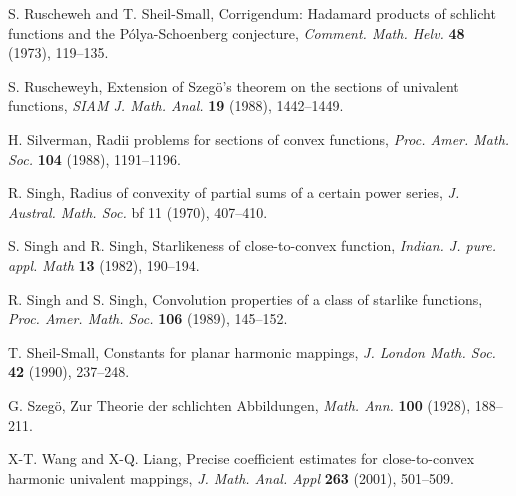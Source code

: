 \documentclass[a4paper,12pt]{amsart}
\theoremstyle{plain}
\theoremstyle{definition}
\begin{document}
\begin{thebibliography}{99}
{\sc S. Ruscheweh} and {\sc T. Sheil-Small}, Corrigendum:  Hadamard products of schlicht functions and the P\'{o}lya-Schoenberg conjecture, {\it Comment. Math. Helv.} {\bf 48} (1973), 119--135.

{\sc S. Ruscheweyh}, Extension of Szeg\"o's theorem on the sections of univalent functions, {\it SIAM J. Math. Anal.} {\bf 19} (1988), 1442--1449.

{\sc H. Silverman}, Radii problems for sections of convex functions, {\it Proc. Amer. Math. Soc.} {\bf 104} (1988), 1191--1196.

{\sc R. Singh}, Radius of convexity of partial sums of a certain power series, {\it J. Austral. Math. Soc.} {bf 11} (1970), 407--410.

{\sc S. Singh} and {\sc R. Singh}, Starlikeness of close-to-convex function, {\it Indian. J. pure. appl. Math} {\bf 13} (1982), 190--194.

{\sc R. Singh} and {\sc S. Singh}, Convolution properties of a class of starlike functions, {\it Proc. Amer. Math. Soc.} {\bf 106} (1989), 145--152.

{\sc T. Sheil-Small}, Constants for planar harmonic mappings, {\it J. London Math. Soc.} {\bf 42} (1990), 237--248.

{\sc G. Szeg\"o}, Zur Theorie der schlichten Abbildungen, {\it Math. Ann.} {\bf 100} (1928), 188--211.

{\sc X-T. Wang} and {\sc X-Q. Liang}, Precise coefficient estimates for close-to-convex harmonic univalent mappings, {\it J. Math. Anal. Appl} {\bf 263} (2001), 501--509.
\end{thebibliography}
\end{document}
